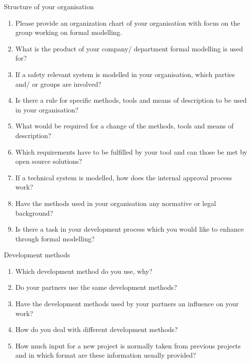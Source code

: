 \documentclass{./template/openetcs_report}
\begin{document}
 
{\begin{enumerate}


	\renewcommand{\theenumi}{\Alph{enumi}}
	\renewcommand{\labelenumi}{\theenumi}

	\renewcommand{\theenumii}{\arabic{enumii}}
	\renewcommand{\labelenumii}{\theenumii}

      {\Large \item Structure of your organisation}

	\begin{enumerate}

	
    	  \item Please provide an organization chart of your organisation with focus on the group working on formal modelling.
    	  \item What is the product of your company/ department formal modelling is used for?
 	  \item If a safety relevant system is modelled in your organisation, which parties and/ or groups are involved?
              \item Is there a rule for specific methods, tools and means of description to be used in your organisation?
  	  \item What would be required for a change of the methods, tools and means of description?
	  \item Which requirements have to be fulfilled by your tool and can those be met by open source solutions?
   	  \item If a technical system is modelled, how does the internal approval process work?
    	  \item Have the methods used in your organisation any normative or legal background?
    	  \item Is there a task in your development process which you would like to enhance through formal modelling?
	\end{enumerate}


     {\Large \item  Development methods}
	

	\begin{enumerate}

	 \item Which development method do you use, why?
	 \item Do your partners use the same development methods?
	 \item Have the development methods used by your partners an influence on your work?
	 \item	How do you deal with different development methods?
	 \item	How much input for a new project is normally taken from previous projects and in which format are these information usually provided?
	\end{enumerate}



\end{enumerate}}
\end{document}

